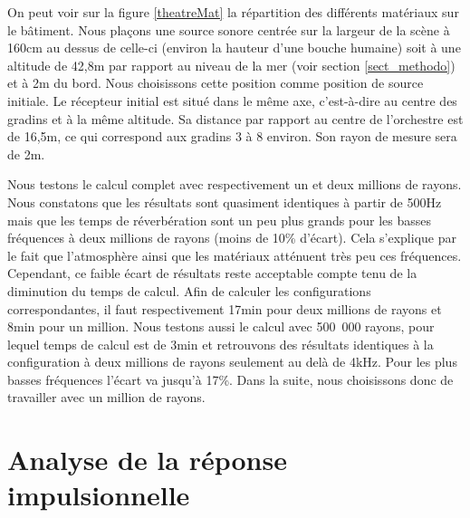 On peut voir sur la figure \ref{theatreMat} la répartition des différents matériaux sur le bâtiment. Nous plaçons une source sonore centrée sur la largeur de la scène à 160cm au dessus de celle-ci (environ la hauteur d'une bouche humaine) soit à une altitude de 42,8m par rapport au niveau de la mer (voir section \ref{sect_methodo}) et à 2m du bord. Nous choisissons cette position comme position de source initiale. Le récepteur initial est situé dans le même axe, c'est-à-dire au centre des gradins et à la même altitude. Sa distance par rapport au centre de l'orchestre est de 16,5m, ce qui correspond aux gradins 3 à 8 environ. Son rayon de mesure sera de 2m. 

Nous testons le calcul complet avec respectivement un et deux millions de rayons. Nous constatons que les résultats sont quasiment identiques à partir de 500Hz mais que les temps de réverbération sont un peu plus grands pour les basses fréquences à deux millions de rayons (moins de 10\% d'écart). Cela s'explique par le fait que l'atmosphère ainsi que les matériaux atténuent très peu ces fréquences. Cependant, ce faible écart de résultats reste acceptable compte tenu de la diminution du temps de calcul. Afin de calculer les configurations correspondantes, il faut respectivement 17min pour deux millions de rayons et 8min pour un million. Nous testons aussi le calcul avec 500~000 rayons, pour lequel temps de calcul est de 3min et retrouvons des résultats identiques à la configuration à deux millions de rayons seulement au delà de 4kHz. Pour les plus basses fréquences l'écart va jusqu'à 17\%. Dans la suite, nous choisissons donc de travailler avec un million de rayons.



\section{Analyse de la réponse impulsionnelle} \label{sect_analyse_rir}



